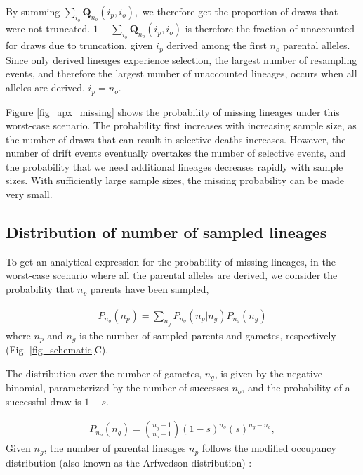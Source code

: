\documentclass[review]{elsarticle}
\begin{document}
By summing $\sum_{i_o} \mathbf{Q}_{n_o}(i_p, i_o),$ we therefore get the proportion of draws that
were not truncated. $1-\sum_{i_o} \mathbf{Q}_{n_o}(i_p, i_o)$ is therefore the fraction of
unaccounted-for draws due to truncation, given $i_p$ derived among the first $n_o$ parental
alleles. Since only derived lineages experience selection, the largest number of resampling events,
and therefore the largest number of unaccounted lineages, occurs when all alleles are derived,
$i_p = n_o$.

Figure \ref{fig_apx_missing} shows the probability of missing lineages under this worst-case scenario. The 
probability first increases with increasing sample size, as the number of draws that can
result in selective deaths increases. However, the number of drift events eventually overtakes the
number of selective events, and the probability that we need additional lineages decreases rapidly
with sample sizes. With sufficiently large sample sizes, the missing probability can be made very small.

\subsection{Distribution of number of sampled lineages}
\label{subsec_distribution}

To get an analytical expression for the probability of missing lineages, in the worst-case scenario
where all the parental alleles are derived, we consider the probability that $n_p$ parents have been
sampled,

\begin{equation}
  \begin{aligned}
    \label{eq_conditional}
    P_{n_o}(n_p) = \sum_{n_g} P_{n_o}(n_p | n_g)P_{n_o}(n_g) 
  \end{aligned}
\end{equation}
where $n_p$ and $n_g$ is the number of sampled parents and gametes, respectively (Fig.
\ref{fig_schematic}C). 

The distribution over the number of gametes, $n_g$, is given by the negative binomial,
parameterized by the number of successes $n_o$, and the probability of a successful draw is $1-s$.

\begin{equation}
  \begin{aligned}
    \label{eq_neg_binomial_trials}
    P_{n_o}(n_g) = \binom{n_g-1}{n_o-1}(1-s)^{n_o}(s)^{n_g-n_o},
  \end{aligned}
\end{equation}
Given $n_g$, the number of parental lineages $n_p$ follows the modified occupancy distribution
(also known as the Arfwedson distribution) \citep{Wakeley2009,ONeill2019,JohnsonEtAl2005}: 
\end{document}
